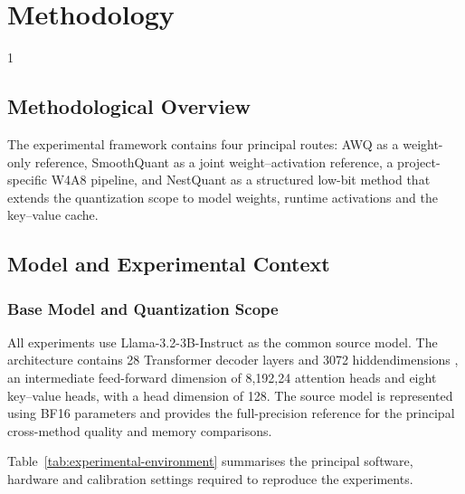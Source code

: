 \doublespacing %

\chapter{Methodology}
\label{ch3}

\begin{spacing}{1} %
\minitoc %
\end{spacing} %
\thesisspacing %


\section{Methodological Overview}
The experimental framework contains four principal routes: {AWQ} as
a weight-only reference, SmoothQuant as a joint weight--activation
reference, a project-specific {W4A8} pipeline, and NestQuant as a
structured low-bit method that extends the quantization scope to model
weights, runtime activations and the key--value cache.

\section{Model and Experimental Context}
\subsection{Base Model and Quantization Scope}
All experiments use Llama-3.2-3B-Instruct as the common source model. The architecture contains 28 Transformer decoder layers and 3072 hiddendimensions , an intermediate feed-forward dimension of 8,192,24 attention heads and eight key--value heads, with a head dimension of 128\cite{meta2024llama32}. The source model is represented using BF16 parameters and provides the full-precision reference for the principal cross-method quality and memory comparisons.

Table~\ref{tab:experimental-environment} summarises the principal
software, hardware and calibration settings required to reproduce the
experiments.

